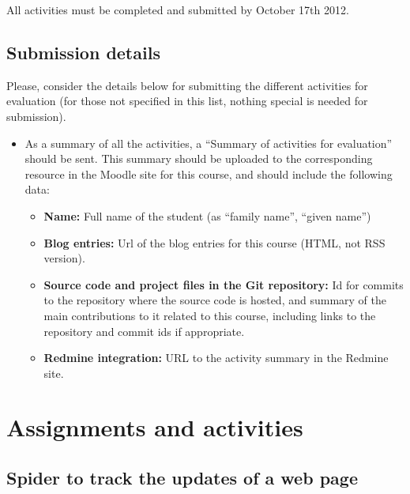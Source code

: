\documentclass[a4paper]{article}
\begin{document}
All activities must be completed and submitted by October 17th 2012.

\subsection{Submission details}

Please, consider the details below for submitting the different activities for evaluation (for those not specified in this list, nothing special is needed for submission).

\begin{itemize}
\item As a summary of all the activities, a ``Summary of activities
  for evaluation'' should be sent. This summary should be uploaded to
  the corresponding resource in the Moodle site for this course, and
  should include the following data: 
  \begin{itemize}
  \item \textbf{Name:} Full name of the student (as ``family name'', ``given name'')
  \item \textbf{Blog entries:} Url of the blog entries for this course (HTML, not RSS version).
  \item \textbf{Source code and project files in the Git repository:} Id for commits
    to the repository where the source code is hosted, and summary of
    the main contributions to it related to this course, including
    links to the repository and commit ids if appropriate. 
  \item \textbf{Redmine integration:} URL to the activity summary in
    the Redmine site.   
  \end{itemize}
\end{itemize}

\section{Assignments and activities}

\subsection{Spider to track the updates of a web page}
\label{sub:python}
\end{document}
